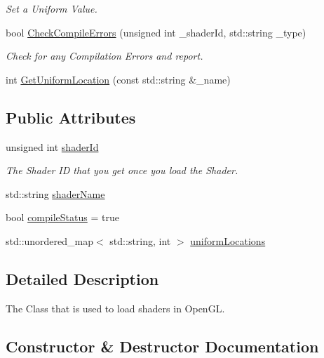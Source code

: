 \begin{DoxyCompactItemize}
\begin{DoxyCompactList}\small\item\em Set a Uniform Value. \end{DoxyCompactList}\item 
bool \mbox{\hyperlink{classpiolot_1_1_g_l_shader_ab2badc2b316c708bf6ea7a4ff39db254}{Check\+Compile\+Errors}} (unsigned int \+\_\+shader\+Id, std\+::string \+\_\+type)
\begin{DoxyCompactList}\small\item\em Check for any Compilation Errors and report. \end{DoxyCompactList}\item 
int \mbox{\hyperlink{classpiolot_1_1_g_l_shader_ac5bf2e67deb4f816e82a50bbe1f168dd}{Get\+Uniform\+Location}} (const std\+::string \&\+\_\+name)
\end{DoxyCompactItemize}
\subsection*{Public Attributes}
\begin{DoxyCompactItemize}
\item 
unsigned int \mbox{\hyperlink{classpiolot_1_1_g_l_shader_a7f05981084b76212d3ee92c71e002fb2}{shader\+Id}}
\begin{DoxyCompactList}\small\item\em The Shader ID that you get once you load the Shader. \end{DoxyCompactList}\item 
std\+::string \mbox{\hyperlink{classpiolot_1_1_g_l_shader_af6cacc0e6d324c39ec3b862dc0ff29a8}{shader\+Name}}
\item 
bool \mbox{\hyperlink{classpiolot_1_1_g_l_shader_aa99f7e5b6b76e8796824278578e4172d}{compile\+Status}} = true
\item 
std\+::unordered\+\_\+map$<$ std\+::string, int $>$ \mbox{\hyperlink{classpiolot_1_1_g_l_shader_adde3ba01aacd0c60bd495ca3b220a1dd}{uniform\+Locations}}
\end{DoxyCompactItemize}


\subsection{Detailed Description}
The Class that is used to load shaders in Open\+GL. 

\subsection{Constructor \& Destructor Documentation}
\mbox{\label{classpiolot_1_1_g_l_shader_a9280ae5003e53461f898dd18b7685eab}} 
